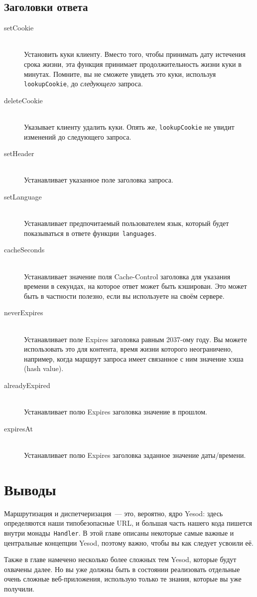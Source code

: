 \subsection{Заголовки ответа}
\begin{description}
\item[setCookie] \hfill \\
Установить куки клиенту. Вместо того, чтобы принимать дату истечения
срока жизни, эта функция принимает продолжительность жизни куки в
минутах. Помните, вы не сможете увидеть это куки, используя
\lstinline!lookupCookie!, до \emph{следующего} запроса.

\item[deleteCookie] \hfill \\
Указывает клиенту удалить куки. Опять же, \lstinline!lookupCookie! не
увидит изменений до следующего запроса.

\item[setHeader] \hfill \\
Устанавливает указанное поле заголовка запроса.

\item[setLanguage] \hfill \\
Устанавливает предпочитаемый пользователем язык, который будет
показываться в ответе функции~\lstinline!languages!.

\item[cacheSeconds] \hfill \\
Устанавливает значение поля Cache-Control заголовка для указания
времени в секундах, на которое ответ может быть кэширован. Это может
быть в частности полезно, если вы используете
 на своём сервере.

\item[neverExpires] \hfill \\
Устанавливает поле Expires заголовка равным 2037-ому году. Вы
можете использовать это для контента, время жизни которого
неограничено, например, когда маршрут запроса имеет связанное с ним
значение хэша (hash value).

\item[alreadyExpired] \hfill \\
Устанавливает полю Expires заголовка значение в прошлом.

\item[expiresAt] \hfill \\
Устанавливает полю Expires заголовка заданное значение даты/времени.
\end{description}

\section{Выводы}
Маршрутизация и диспетчеризация~--- это, вероятно, ядро Yesod: здесь
определяются наши типобезопасные URL, и большая часть нашего кода
пишется внутри монады~\lstinline!Handler!. В этой главе описаны
некоторые самые важные и центральные концепции Yesod, поэтому важно,
чтобы вы как следует усвоили её.

Также в главе намечено несколько более сложных тем Yesod, которые
будут охвачены далее. Но вы уже должны быть в состоянии реализовать
отдельные очень сложные веб-приложения, использую только те знания,
которые вы уже получили.
